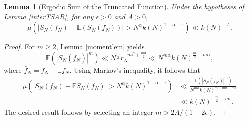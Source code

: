 \documentclass[11pt,twoside,a4paper,reqno]{amsart}
\newtheorem{lemma}[theorem]{Lemma}
\newcommand{\E}{\mathbb{E}}
\begin{document}
\begin{lemma}[Ergodic Sum of the Truncated Function]\label{interESTF}
Under the hypotheses of Lemma \ref{interTSAR}, for any $\epsilon>0$ and $A>0,$
\begin{equation*}
\mu\left(\left|S_N(f_N)-\E (S_N(f_N)) \right| > N^{\alpha} k(N)^{1-\alpha-\epsilon}\right) \ll k(N)^{-A}.
\end{equation*}
\end{lemma}
\begin{proof}
For $m\geq 2$, Lemma \ref{momentlem} yields
\begin{equation*}
\E(|S_N(\bar{f}_N)|^m) \ll N^{\frac{m}{2}} r_N^{- m\beta + \frac{md}{2}} \ll N^{m\alpha} k(N)^{\frac{m}{2}-m\alpha},
\end{equation*}
where $\bar{f}_N = f_N - \E f_N$. Using Markov's inequality, it follows that
\begin{align*}
\mu\left( \left| S_N(f_N) -\E S_N(f_N) \right| > N^{\alpha} k(N)^{1-\alpha-\epsilon} \right)
& \ll \frac{\E\left(\left|S_N(\bar{f}_N)\right|^m\right)}{N^{m\alpha} k(N)^{m-m\alpha-m\epsilon}}\\
& \ll k(N)^{-\frac{m}{2} + m \epsilon}.
\end{align*}
The desired result follows by selecting an integer $m>2A/(1-2\epsilon).$
\end{proof}
\end{document}
